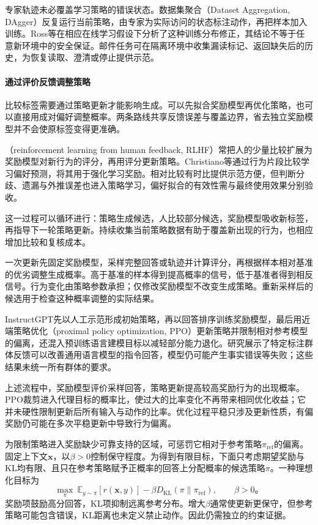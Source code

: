 专家轨迹未必覆盖学习策略的错误状态。数据集聚合（Dataset Aggregation, DAgger）反复运行当前策略，由专家为实际访问的状态标注动作，再把样本加入训练。Ross等在相应在线学习假设下分析了这种训练分布修正，其结论不等于任意新环境中的安全保证。邮件任务可在隔离环境中收集漏读标记、返回缺失后的历史，为恢复读取、澄清或停止提供示范。

\paragraph{通过评价反馈调整策略}

比较标签需要通过策略更新才能影响生成。可以先拟合奖励模型再优化策略，也可以直接用成对偏好调整概率。两条路线共享反馈误差与覆盖边界，省去独立奖励模型并不会使原标签变得更准确。

（reinforcement learning from human feedback, RLHF）常把人的少量比较扩展为奖励模型对新行为的评分，再用评分更新策略。Christiano等通过行为片段比较学习偏好预测，将其用于强化学习奖励。相对比较有时比提供示范方便，但判断分歧、遗漏与外推误差也进入策略学习，偏好拟合的有效性需与最终使用效果分别验收。

这一过程可以循环进行：策略生成候选，人比较部分候选，奖励模型吸收新标签，再指导下一轮策略更新。持续收集当前策略数据有助于覆盖新出现的行为，也相应增加比较和复核成本。

一次更新先固定奖励模型，采样完整回答或轨迹并计算评分，再根据样本相对基准的优劣调整生成概率。高于基准的样本得到提高概率的信号，低于基准者得到相反信号。行为变化由策略参数承担；仅修改奖励模型不改变生成策略。重新采样后的候选用于检查这种概率调整的实际结果。

InstructGPT先以人工示范形成初始策略，再以回答排序训练奖励模型，最后用近端策略优化（proximal policy optimization, PPO）更新策略并限制相对参考模型的偏离，还混入预训练语言建模目标以减轻部分能力退化。研究展示了特定标注群体反馈可以改善通用语言模型的指令回答，模型仍可能产生事实错误等失败；这些结果未统一所有群体的要求。

上述流程中，奖励模型评价采样回答，策略更新提高较高奖励行为的出现概率。PPO裁剪进入代理目标的概率比，使过大的比率变化不再带来相同优化收益；它并未硬性限制更新后所有输入与动作的比率。优化过程平稳只涉及更新性质，有偏奖励仍可能在多次平稳更新中导致行为偏离。

为限制策略进入奖励缺少可靠支持的区域，可惩罚它相对于参考策略$\pi_{\mathrm{ref}}$的偏离。固定上下文$\bm{x}$，以$\beta>0$控制保守程度。为得到有限目标，下面只考虑期望奖励与KL均有限、且只在参考策略赋予正概率的回答上分配概率的候选策略$\pi$。一种理想化目标为
\begin{equation}
 \max_\pi\
 \mathbb E_{y\sim\pi}[r(\bm{x},y)]
 -\beta D_{\mathrm{KL}}(\pi\|\pi_{\mathrm{ref}}),
 \qquad \beta>0\text{。}
 \label{eq:alignment-kl-objective}
\end{equation}
奖励项鼓励高分回答，KL项抑制远离参考分布。增大$\beta$通常使更新更保守，但参考策略可能包含错误，KL距离也未定义禁止动作。因此仍需独立的约束证据。

